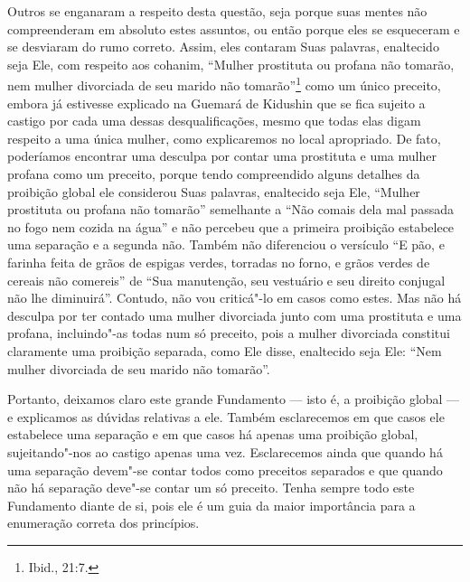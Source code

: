 Outros se enganaram a respeito desta questão, seja porque suas mentes
não compreenderam em absoluto estes assuntos, ou então porque eles se
esqueceram e se desviaram do rumo correto. Assim, eles contaram Suas
palavras, enaltecido seja Ele, com respeito aos cohanim\starr, ``Mulher
prostituta ou profana não tomarão, nem mulher divorciada de seu marido
não tomarão''\footnote{Ibid., 21:7.} como um único preceito, embora já estivesse
explicado na Guemará\starr{} de Kidushin\starr{} que se fica sujeito a castigo por cada
uma dessas desqualificações, mesmo que todas elas digam respeito a uma
única mulher, como explicaremos no local apropriado. De fato, poderíamos
encontrar uma desculpa por contar uma
prostituta e uma mulher profana como um preceito, porque tendo
compreendido alguns detalhes da proibição global ele considerou Suas
palavras, enaltecido seja Ele, ``Mulher prostituta ou profana não
tomarão'' semelhante a ``Não comais dela mal passada no fogo nem cozida
na água'' e não percebeu que a primeira proibição estabelece uma
separação e a segunda não. Também não diferenciou o versículo ``E pão,
e farinha feita de grãos de espigas verdes, torradas no forno, e grãos
verdes de cereais não comereis'' de ``Sua manutenção, seu vestuário e
seu direito conjugal não lhe diminuirá''. Contudo, não vou criticá"-lo
em casos como estes. Mas não há desculpa por ter contado uma mulher
divorciada junto com uma prostituta e uma profana, incluindo"-as todas
num só preceito, pois a mulher divorciada constitui claramente uma
proibição separada, como Ele disse, enaltecido seja Ele: ``Nem mulher
divorciada de seu marido não tomarão''.

Portanto, deixamos claro este grande Fundamento --- isto é, a proibição
global --- e explicamos as dúvidas relativas a ele. Também esclarecemos
em que casos ele estabelece uma separação e em que casos há apenas uma
proibição global, sujeitando"-nos ao castigo apenas uma vez.
Esclarecemos ainda que quando há uma separação devem"-se contar todos
como preceitos separados e que quando não há separação deve"-se contar um
só preceito. Tenha sempre todo este Fundamento diante de si, pois ele é
um guia da maior importância para a enumeração correta dos princípios.



